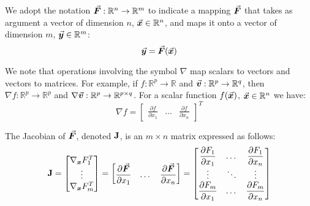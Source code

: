 We adopt the notation $\vec{\bm{F}}:\mathbb{R}^n\rightarrow\mathbb{R}^m$ to indicate a 
mapping $\vec{\bm{F}}$ that takes as argument a vector of dimension $n$, 
$\vec{\bm{x}}\in\mathbb{R}^n$, and maps it onto a vector of dimension $m$, 
$\vec{\bm{y}}\in\mathbb{R}^m$:
\begin{equation*}
	\vec{\bm{y}} = \vec{\bm{F}}(\vec{\bm{x}})
\end{equation*}

We note that operations involving the symbol $\nabla$ map scalars to
vectors and vectors to matrices. For example, if $f:\mathbb{R}^p\rightarrow 
\mathbb{R}$ and
$\vec{\bm{v}}:\mathbb{R}^p\rightarrow\mathbb{R}^q$, then $\nabla
f:\mathbb{R}^p\rightarrow\mathbb{R}^p$ and
$\nabla\vec{\bm{v}}:\mathbb{R}^p\rightarrow\mathbb{R}^{p\times q}$. For a scalar function 
$f(\vec{\bm{x}})$, $\vec{\bm{x}}\in\mathbb{R}^n$ we have:
\begin{equation*}
	\nabla f = \begin{bmatrix}
		\displaystyle\frac{\partial f}{\partial x_1} & \dots & 
		\displaystyle\frac{\partial f}{\partial x_n}
	\end{bmatrix}^T
\end{equation*}

The Jacobian of $\vec{\bm{F}}$, denoted $\mathbf{J}$, is an $m\times n$ matrix expressed as 
follows:
\begin{equation*}
	\mathbf{J} = \begin{bmatrix}
		\nabla_{\bm{x}}F_1^T\\
		\vdots\\
		\nabla_{\bm{x}}F_m^T\\
	\end{bmatrix} = \begin{bmatrix}
\displaystyle	\frac{\partial \vec{\bm{F}}}{\partial x_1} & \dots & 
\displaystyle\frac{\partial \vec{\bm{F}}}{\partial 
	x_n}\end{bmatrix} = \begin{bmatrix}
		\displaystyle\frac{\partial F_1}{\partial x_1} & \dots & 
		\displaystyle\frac{\partial F_1}{\partial x_n}\\
		\vdots & \ddots & \vdots\\
		\displaystyle\frac{\partial F_m}{\partial x_1} & \dots & 
		\displaystyle\frac{\partial F_m}{\partial x_n} 
	\end{bmatrix}
\end{equation*}
